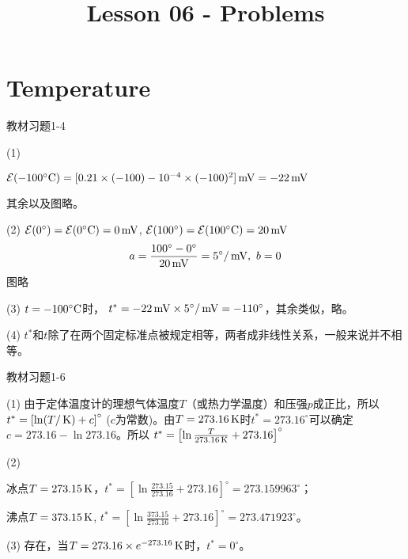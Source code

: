 \documentclass[CJK]{beamer}
\title{Lesson 06 - Problems}
\author{}
\date{}
\begin{document}

\section{Temperature}

\begin{frame}
\bch
{\blue 教材习题1-4}

{\scriptsize
\bitem
\item[(1)]{$\mathcal{E}(-100^\circ \mathrm{C}) = [0.21\times (-100) - 10^{-4}\times (-100)^2] \,\mathrm{mV} = -22 \,\mathrm{mV}$

其余以及图略。}
\item[(2)]{ $\mathcal{E}(0^\circ) =\mathcal{E}(0^\circ \mathrm{C}) = 0 \,\mathrm{mV}$, $\mathcal{E}(100^\circ) = \mathcal{E}(100^\circ \mathrm{C}) = 20 \,\mathrm{mV}$
$$a = \frac{100^\circ - 0^\circ}{20\,\mathrm{mV}} =5 ^\circ/\,\mathrm{mV},\ b = 0$$ 图略}
\item[(3)]{$t = -100^\circ \mathrm{C}$时， $t^*=-22\,\mathrm{mV} \times 5^\circ/\,\mathrm{mV} = -110^\circ$，其余类似，略。}
\item[(4)]{$t^*$和$t$除了在两个固定标准点被规定相等，两者成非线性关系，一般来说并不相等。}
\eitem
}
\ech
\end{frame}


\begin{frame}
\bch
{\blue 教材习题1-6}

{\scriptsize
\bitem
\item[(1)]{由于定体温度计的理想气体温度$T$（或热力学温度）和压强$p$成正比，所以 $t^* = \left[\ln (T/\,\mathrm{K}) + c\right]^\circ$ ($c$为常数)。由$T=273.16\,\mathrm{K}$时$t^* = 273.16^\circ$可以确定$c=273.16-\ln 273.16$。所以 $t^* = \left[\ln \frac{T}{273.16\,\mathrm{K}} + 273.16\right]^\circ$}
\item[(2)]{冰点$T = 273.15\,\mathrm{K}$，$t^* = \left[\ln \frac{273.15}{273.16}+273.16\right]^\circ = 273.159963^\circ$；

沸点$T=373.15\,\mathrm{K}$, $t^* =  \left[\ln \frac{373.15}{273.16}+273.16\right]^\circ = 273.471923^\circ$。}
\item[(3)]{存在，当$T=273.16\times e^{-273.16}\,\mathrm{K}$时，$t^* = 0^\circ$。}
\eitem
}
\ech
\end{frame}
\end{document}

